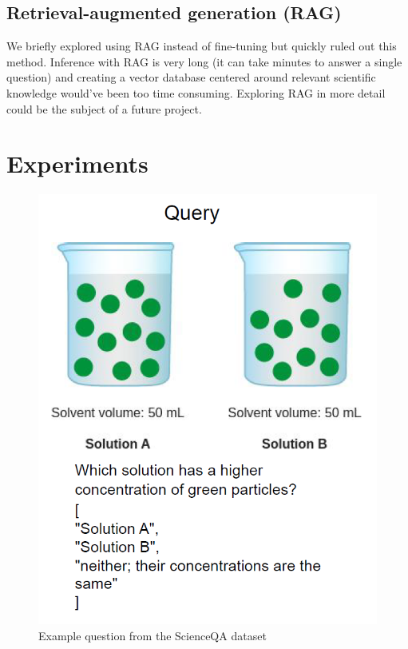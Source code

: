 \documentclass{article}
\begin{document}
\subsection{Retrieval-augmented generation (RAG)}
We briefly explored using RAG instead of fine-tuning but quickly ruled out this method. Inference with RAG is very long (it can take minutes to answer a single question) and creating a vector database centered around relevant scientific knowledge would've been too time consuming. Exploring RAG in more detail could be the subject of a future project.

\section{Experiments}
\label{sec:experiments}

\begin{figure}
  \centering
  \centerline{\includegraphics[scale=0.5]{example_question.png}}
  \caption{Example question from the ScienceQA dataset}
  \label{fig:example_q}
\end{figure}
\end{document}
